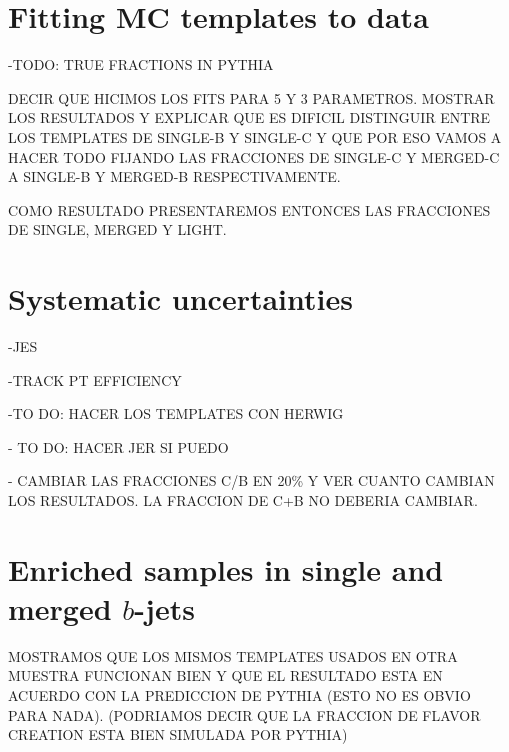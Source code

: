 \section{Fitting MC templates to data}\label{sec:FitsResults}

-TODO: TRUE FRACTIONS IN PYTHIA

DECIR QUE HICIMOS LOS FITS PARA 5 Y 3 PARAMETROS. MOSTRAR LOS RESULTADOS Y EXPLICAR QUE ES DIFICIL DISTINGUIR ENTRE LOS TEMPLATES DE SINGLE-B Y SINGLE-C Y QUE POR ESO VAMOS A HACER TODO FIJANDO LAS FRACCIONES DE SINGLE-C Y MERGED-C A SINGLE-B Y MERGED-B RESPECTIVAMENTE.

COMO RESULTADO PRESENTAREMOS ENTONCES LAS FRACCIONES DE SINGLE, MERGED Y LIGHT.


\section{Systematic uncertainties}\label{sec:FractionSystematics}

-JES

-TRACK PT EFFICIENCY

-TO DO: HACER LOS TEMPLATES CON HERWIG

- TO DO: HACER JER SI PUEDO

- CAMBIAR LAS FRACCIONES C/B EN 20\% Y VER CUANTO CAMBIAN LOS RESULTADOS. LA FRACCION DE C+B NO DEBERIA CAMBIAR.

\section{Enriched samples in single and merged $b$-jets}\label{sec:Enriched}

MOSTRAMOS QUE LOS MISMOS TEMPLATES USADOS EN OTRA MUESTRA FUNCIONAN BIEN Y QUE EL RESULTADO ESTA EN ACUERDO CON LA PREDICCION DE PYTHIA (ESTO NO ES OBVIO PARA NADA).
(PODRIAMOS DECIR QUE LA FRACCION DE FLAVOR CREATION ESTA BIEN SIMULADA POR PYTHIA)
